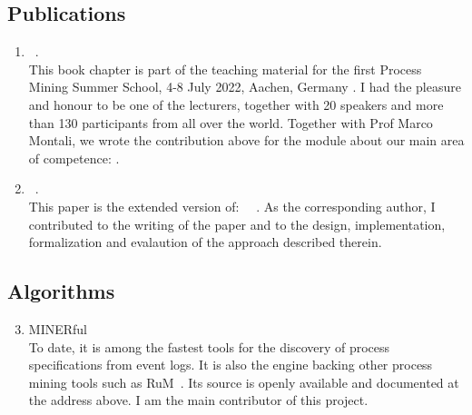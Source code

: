 \subsection*{Publications}
\begin{enumerate}
	\item {}~\cite{DiCiccio.Montali/PMH2022:DeclarativeProcessMining}.
	\\[2ex]
	This book chapter is part of the teaching material for the first Process Mining Summer School, 4-8 July 2022, Aachen, Germany . I had the pleasure and honour to be one of the lecturers, together with 20 speakers and more than 130 participants from all over the world. Together with Prof Marco Montali, we wrote the contribution above for the module about our main area of competence: .
	\item {}~\cite{DiCiccio.etal/IS2017:ResolvingInconsistenciesRedundanciesDeclare}.
	\\[2ex] 
	This paper is the extended version of: ~\cite{DiCiccio.etal/BPM2015:EnsuringModelConsistency}~.
	As the corresponding author, I contributed to the writing of the paper and to the design, implementation, formalization and evalaution of the approach described therein.
\end{enumerate}
%
\subsection*{Algorithms}
\begin{enumerate}\setcounter{enumi}{2}
	\item MINERful  \cite{DiCiccio.Mecella/CIDM2013:TwoStepFast}
	\\[2ex]
	To date, it is among the fastest tools for the discovery of process specifications from event logs. It is also the engine backing other process mining tools such as RuM~\cite{Alman.etal/BPM2021:RuMDeclarativeProcessMiningDistilled}. Its source is openly available and documented at the address above. I am the main contributor of this project.
\end{enumerate}
%
